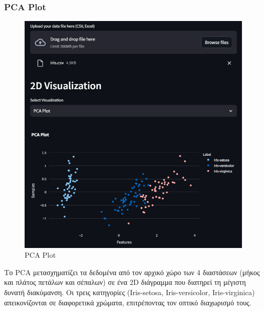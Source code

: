 \documentclass{article}
\begin{document}
\subsubsection{PCA Plot}
\begin{figure}[h!]
  \centering
  \includegraphics[width=0.6\textheight]{photos/pca.png}
  \caption{PCA Plot}
  \label{fig:PCA Plot}
\end{figure}
\vspace{0.3 cm}
Το PCA μετασχηματίζει τα δεδομένα από τον αρχικό χώρο των 4 διαστάσεων (μήκος και πλάτος πετάλων και σέπαλων) σε ένα 2D διάγραμμα που διατηρεί τη μέγιστη δυνατή διακύμανση. Οι τρεις κατηγορίες (Iris-setosa, Iris-versicolor, Iris-virginica) απεικονίζονται σε διαφορετικά χρώματα, επιτρέποντας τον οπτικό διαχωρισμό τους.
\newpage
\end{document}
